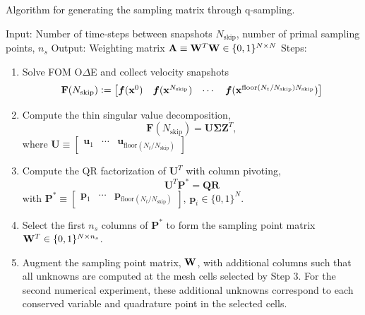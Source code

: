 \documentclass[3p,computermodern,10pt]{elsarticle}
\begin{document}
\begin{appendices}
\begin{algorithm}
\caption{Algorithm for generating the sampling matrix through q-sampling.}
\label{alg:qdeim}
Input: Number of time-steps between snapshots $N_{\text{skip}}$, number of primal sampling points, $n_s$ \; 
Output: Weighting matrix $\mathbf{A} \equiv \mathbf{W}^T \mathbf{W} \in \{0,1\}^{N \times N}$ \;
Steps:
\begin{enumerate}
    \item Solve FOM O$\Delta$E and collect velocity snapshots 
$$\mathbf{F}(N_{\text{skip}}) \vcentcolon= \begin{bmatrix} \boldsymbol f ({\mathbf{x}}^{0})  & \boldsymbol f( {\mathbf{x}}^{N_{\text{skip}}}) & \cdots & \boldsymbol f( {\mathbf{x}}^{\text{floor}(N_t/N_{\text{skip}})N_{\text{skip}}} ) \end{bmatrix}$$
    \item Compute the thin singular value decomposition, $$\mathbf{F} (N_{\text{skip}}) = \mathbf{U \Sigma Z}^T,$$
    where $\mathbf{U} \equiv \begin{bmatrix} \mathbf{u}_1 & \cdots & \mathbf{u}_{\text{floor}(N_t/N_{\text{skip}})}\end{bmatrix}$
    \item Compute the QR factorization of  $\mathbf{U}^T$ with column pivoting,
    \begin{equation*}
        \mathbf{U}^T \mathbf{P}^* = \mathbf{QR}
    \end{equation*}
    with $\mathbf{P}^* \equiv \begin{bmatrix} \mathbf{p}_1 & \cdots & \mathbf{p}_{\text{floor}(N_t/N_{\text{skip}})} \end{bmatrix}$, $\mathbf{p}_i \in \{0,1\}^N$. 
    \item Select the first $n_s$ columns of $\mathbf{P}^*$ to form the sampling point matrix $\mathbf{W}^T \in \{0,1\}^{N \times n_s}$. 
    \item Augment the sampling point matrix, $\mathbf{W}$, with additional columns such that all unknowns are computed at the mesh cells selected by Step 3. For the second numerical experiment, these additional unknowns correspond to each conserved variable and quadrature point in the selected cells. 
\end{enumerate}


\end{algorithm}




\end{appendices}
\end{document}
